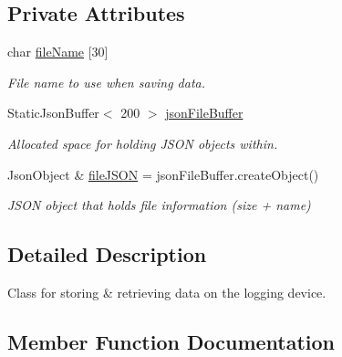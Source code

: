 \subsection*{Private Attributes}
\begin{DoxyCompactItemize}
\item 
\mbox{\label{class_storage_a7c3e886a0b8395c2045ab4f7e04481e1}} 
char \hyperlink{class_storage_a7c3e886a0b8395c2045ab4f7e04481e1}{file\+Name} \mbox{[}30\mbox{]}
\begin{DoxyCompactList}\small\item\em File name to use when saving data. \end{DoxyCompactList}\item 
\mbox{\label{class_storage_a14a7ad7e46c7cd5983344b81fed4265f}} 
Static\+Json\+Buffer$<$ 200 $>$ \hyperlink{class_storage_a14a7ad7e46c7cd5983344b81fed4265f}{json\+File\+Buffer}
\begin{DoxyCompactList}\small\item\em Allocated space for holding J\+S\+ON objects within. \end{DoxyCompactList}\item 
\mbox{\label{class_storage_ac503241aaa812f9b8ee36dd10cbd915a}} 
Json\+Object \& \hyperlink{class_storage_ac503241aaa812f9b8ee36dd10cbd915a}{file\+J\+S\+ON} = json\+File\+Buffer.\+create\+Object()
\begin{DoxyCompactList}\small\item\em J\+S\+ON object that holds file information (size + name) \end{DoxyCompactList}\end{DoxyCompactItemize}


\subsection{Detailed Description}
Class for storing \& retrieving data on the logging device. 

\subsection{Member Function Documentation}
\mbox{\label{class_storage_a98b01eb20a64a4bf4127685147f7f6f1}} 
